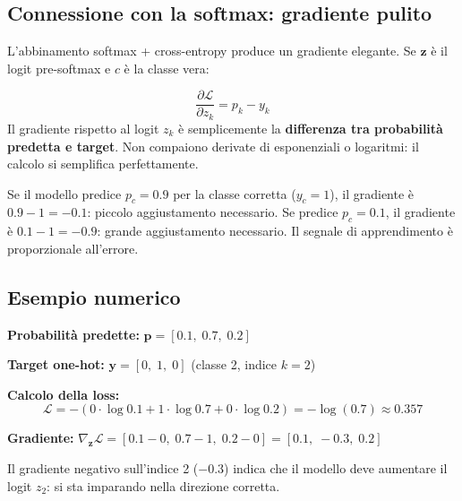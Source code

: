 \documentclass[
  11pt,
]{article}
\begin{document}
\subsection{Connessione con la softmax: gradiente pulito}

L'abbinamento softmax + cross-entropy produce un gradiente elegante. Se $\mathbf{z}$ è il logit pre-softmax e $c$ è la classe vera:

\begin{formulabox}[title={\textbf{Gradiente softmax + cross-entropy}}]
\[
\frac{\partial \mathcal{L}}{\partial z_k} = p_k - y_k
\]
Il gradiente rispetto al logit $z_k$ è semplicemente la \textbf{differenza tra probabilità predetta e target}. Non compaiono derivate di esponenziali o logaritmi: il calcolo si semplifica perfettamente.
\end{formulabox}

\begin{notabox}[title={\textbf{Intuizione del gradiente $p_k - y_k$}}]
Se il modello predice $p_c = 0.9$ per la classe corretta ($y_c = 1$), il gradiente è $0.9 - 1 = -0.1$: piccolo aggiustamento necessario. Se predice $p_c = 0.1$, il gradiente è $0.1 - 1 = -0.9$: grande aggiustamento necessario. Il segnale di apprendimento è proporzionale all'errore.
\end{notabox}

\subsection{Esempio numerico}

\begin{notabox}[title={\textbf{Esempio: classificazione a 3 classi, classe vera = 2}}]
\textbf{Probabilità predette:} $\mathbf{p} = [0.1,\; 0.7,\; 0.2]$

\textbf{Target one-hot:} $\mathbf{y} = [0,\; 1,\; 0]$ (classe 2, indice $k=2$)

\textbf{Calcolo della loss:}
\[
\mathcal{L} = -(0 \cdot \log 0.1 + 1 \cdot \log 0.7 + 0 \cdot \log 0.2) = -\log(0.7) \approx 0.357
\]

\textbf{Gradiente:} $\nabla_{\mathbf{z}} \mathcal{L} = [0.1 - 0,\; 0.7 - 1,\; 0.2 - 0] = [0.1,\; -0.3,\; 0.2]$

Il gradiente negativo sull'indice 2 ($-0.3$) indica che il modello deve aumentare il logit $z_2$: si sta imparando nella direzione corretta.
\end{notabox}

\end{document}

